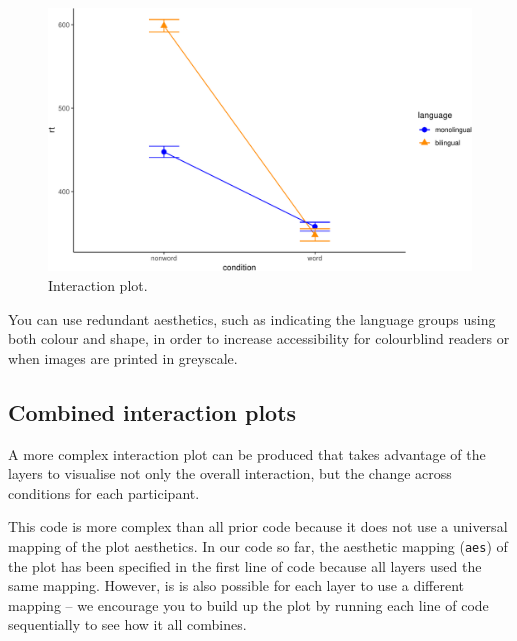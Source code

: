 \documentclass[
  english,
  doc,floatsintext]{apa6}
\begin{document}
\begin{figure}

{\centering \includegraphics[width=1\linewidth]{images/ixn-1} 

}

\caption{Interaction plot.}\label{fig:ixn}
\end{figure}

You can use redundant aesthetics, such as indicating the language groups using both colour and shape, in order to increase accessibility for colourblind readers or when images are printed in greyscale.

\hypertarget{combined-interaction-plots}{%
\subsection{Combined interaction plots}\label{combined-interaction-plots}}

A more complex interaction plot can be produced that takes advantage of the layers to visualise not only the overall interaction, but the change across conditions for each participant.

This code is more complex than all prior code because it does not use a universal mapping of the plot aesthetics. In our code so far, the aesthetic mapping (\texttt{aes}) of the plot has been specified in the first line of code because all layers used the same mapping. However, is is also possible for each layer to use a different mapping -- we encourage you to build up the plot by running each line of code sequentially to see how it all combines.
\end{document}
